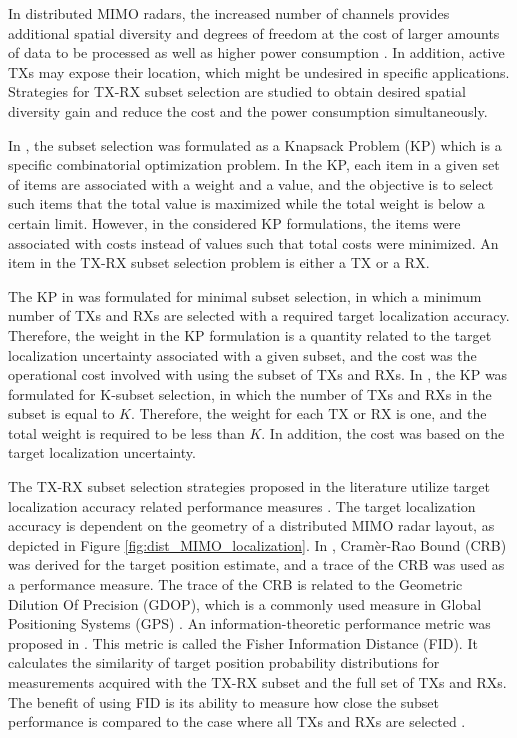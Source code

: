 \documentclass[english, 12pt, a4paper, elec, utf8, a-1b, online]{aaltothesis}
\numberwithin{equation}{section}
\begin{document}
In distributed MIMO radars, the increased number of channels provides additional spatial diversity and degrees of freedom at the cost of larger amounts of data to be processed as well as higher power consumption \cite{Haimovich2008}.
In addition, active TXs may expose their location, which might be undesired in specific applications.
Strategies for TX-RX subset selection are studied to obtain desired spatial diversity gain and reduce the cost and the power consumption simultaneously.

In \cite{Godrich2011a, Godrich2011}, the subset selection was formulated as a Knapsack
Problem (KP) which is a specific combinatorial optimization problem.
In the KP, each item in a given set of items are associated with a weight and a value, and the objective is to select such items that the total value is maximized while the total weight is below a certain limit.
However, in the considered KP formulations, the items were associated with costs instead of values such that total costs were minimized.
An item in the TX-RX subset selection problem is either a TX or a RX.

The KP in \cite{Godrich2011a} was formulated for minimal subset selection, in which a minimum number of TXs and RXs are selected with a required target localization accuracy.
Therefore, the weight in the KP formulation is a quantity related to the target localization uncertainty associated with a given subset, and the cost was the operational cost involved with using the subset of TXs and RXs.
In \cite{Godrich2011}, the KP was formulated for K-subset selection, in which the number of TXs and RXs in the subset is equal to $K$.
Therefore, the weight for each TX or RX is one, and the total weight is required to be less than $K$.
In addition, the cost was based on the target localization uncertainty.

The TX-RX subset selection strategies proposed in the literature utilize target localization accuracy related performance measures \cite{Godrich2011a, Godrich2011, Sun2014}.
The target localization accuracy is dependent on the geometry of a distributed MIMO radar layout, as depicted in Figure \ref{fig:dist_MIMO_localization}.
In \cite{Godrich2011a, Godrich2011}, Cram\`er-Rao Bound (CRB) was derived for the target position estimate, and a trace of the CRB was used as a performance measure.
The trace of the CRB is related to the Geometric Dilution Of Precision (GDOP), which is a commonly used measure in Global Positioning Systems (GPS) \cite{Sun2014}. 
An information-theoretic performance metric was proposed in \cite{Sun2014}.
This metric is called the Fisher Information Distance (FID). 
It calculates the similarity of target position probability distributions for measurements acquired with the TX-RX subset and the full set of TXs and RXs. 
The benefit of using FID is its ability to measure how close the subset performance is compared to the case where all TXs and RXs are selected \cite{Sun2014}.
\end{document}
